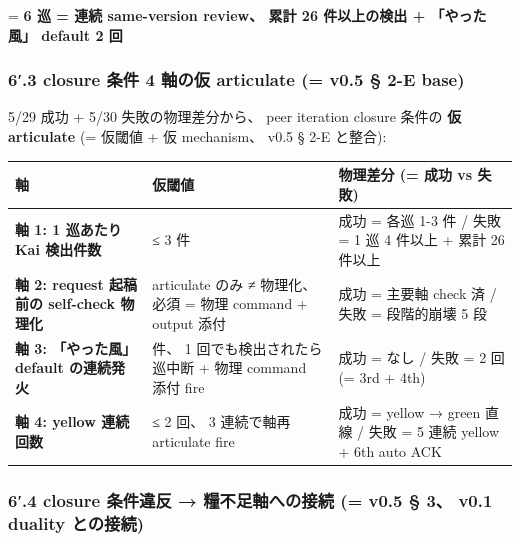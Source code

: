 \documentclass[
]{article}
\newcounter{none} %
\begin{document}
= \textbf{6 巡 = 連続 same-version review、 累計 26 件以上の検出 +
「やった風」 default 2 回}

\subsubsection{6′.3 closure 条件 4 軸の仮 articulate (= v0.5 § 2-E
base)}\label{closure-ux6761ux4ef6-4-ux8ef8ux306eux4eee-articulate-v0.5-2-e-base}

5/29 成功 + 5/30 失敗の物理差分から、 peer iteration closure 条件の
\textbf{仮 articulate} (= 仮閾値 + 仮 mechanism、 v0.5 § 2-E と整合):

{\def\LTcaptype{none} %
\begin{longtable}[]{@{}
  >{\raggedright\arraybackslash}p{}
  >{\raggedright\arraybackslash}p{}
  >{\raggedright\arraybackslash}p{}@{}}
\toprule\noalign{}
\begin{minipage}[b]{\linewidth}\raggedright
軸
\end{minipage} & \begin{minipage}[b]{\linewidth}\raggedright
仮閾値
\end{minipage} & \begin{minipage}[b]{\linewidth}\raggedright
物理差分 (= 成功 vs 失敗)
\end{minipage} \\
\midrule\noalign{}
\endhead
\bottomrule\noalign{}
\endlastfoot
\textbf{軸 1: 1 巡あたり Kai 検出件数} & ≤ 3 件 & 成功 = 各巡 1-3 件 /
失敗 = 1 巡 4 件以上 + 累計 26 件以上 \\
\textbf{軸 2: request 起稿前の self-check 物理化} & articulate のみ ≠
物理化、 必須 = 物理 command + output 添付 & 成功 = 主要軸 check 済 /
失敗 = 段階的崩壊 5 段 \\
\textbf{軸 3: 「やった風」 default の連続発火} & 0 件、 1
回でも検出されたら巡中断 + 物理 command 添付 fire & 成功 = なし / 失敗 =
2 回 (= 3rd + 4th) \\
\textbf{軸 4: yellow 連続回数} & ≤ 2 回、 3 連続で軸再 articulate fire &
成功 = yellow → green 直線 / 失敗 = 5 連続 yellow + 6th auto ACK \\
\end{longtable}
}

\subsubsection{6′.4 closure 条件違反 → 糧不足軸への接続 (= v0.5 § 3、
v0.1 duality
との接続)}\label{closure-ux6761ux4ef6ux9055ux53cd-ux7ce7ux4e0dux8db3ux8ef8ux3078ux306eux63a5ux7d9a-v0.5-3-v0.1-duality-ux3068ux306eux63a5ux7d9a}
\end{document}
